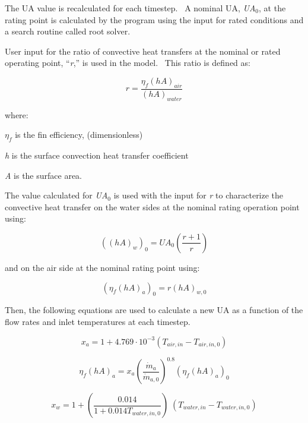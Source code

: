The UA value is recalculated for each timestep.~ A nominal UA, \emph{UA\(_{0}\)}, at the rating point is calculated by the program using the input for rated conditions and a search routine called root solver.

User input for the ratio of convective heat transfers at the nominal or rated operating point, ``\emph{r},'' is used in the model.~ This ratio is defined as:

\begin{equation}
r = \frac{{{\eta_f}{{\left( {hA} \right)}_{air}}}}{{{{\left( {hA} \right)}_{water}}}}
\end{equation}

where:

\({\eta_f}\) is the fin efficiency, (dimensionless)

\emph{h} is the surface convection heat transfer coefficient

\emph{A} is the surface area.

The value calculated for \emph{UA}\(_{0}\) is used with the input for \emph{r} to characterize the convective heat transfer on the water sides at the nominal rating operation point using:

\begin{equation}
{\left( {{{\left( {hA} \right)}_w}} \right)_0} = U{A_0}\left( {\frac{{r + 1}}{r}} \right)
\end{equation}

and on the air side at the nominal rating point using:

\begin{equation}
{\left( {{\eta_f}{{\left( {hA} \right)}_a}} \right)_0} = r{\left( {hA} \right)_{w,0}}
\end{equation}

Then, the following equations are used to calculate a new UA as a function of the flow rates and inlet temperatures at each timestep.

\begin{equation}
{x_a} = 1 + 4.769\cdot {10^{ - 3}}\left( {{T_{air,in}} - {T_{air,in,0}}} \right)
\end{equation}

\begin{equation}
{\eta_f}{\left( {hA} \right)_a} = {x_a}{\left( {\frac{{{{\dot m}_a}}}{{{{\dot m}_{a,0}}}}} \right)^{0.8}}{\left( {{\eta_f}{{\left( {hA} \right)}_a}} \right)_0}
\end{equation}

\begin{equation}
{x_w} = 1 + \left( {\frac{{0.014}}{{1 + 0.014{T_{water,in,0}}}}} \right)\;\left( {{T_{water,in}} - {T_{water,in,0}}} \right)
\end{equation}


